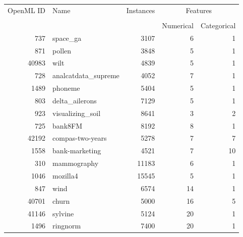 \begin{table}
\centering
\begin{tabular}{rlrrr}
\toprule
\multirow{2}{*}{OpenML ID} & \multirow{2}{*}{Name} & \multirow{2}{*}{Instances} & \multicolumn{2}{c}{Features} \\ \cline{4-5}
\\[-0.75em]
&                       &                            & Numerical    & Categorical   \\
\midrule
       737 &                       space\_ga &         3107 &                6 &                1 \\
       871 &                         pollen &         3848 &                5 &                1 \\
     40983 &                           wilt &         4839 &                5 &                1 \\
       728 &            analcatdata\_supreme &         4052 &                7 &                1 \\
      1489 &                        phoneme &         5404 &                5 &                1 \\
       803 &                 delta\_ailerons &         7129 &                5 &                1 \\
       923 &               visualizing\_soil &         8641 &                3 &                2 \\
       725 &                        bank8FM &         8192 &                8 &                1 \\
     42192 &               compas-two-years &         5278 &                7 &                7 \\
      1558 &                 bank-marketing &         4521 &                7 &               10 \\
       310 &                    mammography &        11183 &                6 &                1 \\
      1046 &                       mozilla4 &        15545 &                5 &                1 \\
       847 &                           wind &         6574 &               14 &                1 \\
     40701 &                          churn &         5000 &               16 &                5 \\
     41146 &                        sylvine &         5124 &               20 &                1 \\
      1496 &                       ringnorm &         7400 &               20 &                1 \\

\end{tabular}
\end{table}
